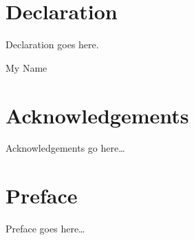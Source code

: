 \chapter*{Declaration}
\thispagestyle{empty}
  Declaration goes here.
  \vspace*{1cm}
  \begin{flushright}
    My Name
  \end{flushright}
\clearpage

\chapter*{Acknowledgements}
\thispagestyle{empty}
Acknowledgements go here\dots
\clearpage

\chapter*{Preface}
\thispagestyle{empty}
Preface goes here\dots
\clearpage

\listoftodos

\tableofcontents

\listoffigures
\listoftables
